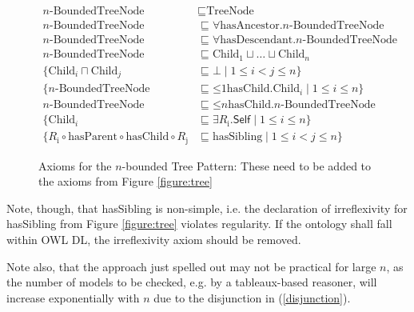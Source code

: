 \begin{figure}[t]
\begin{align}
n\text{-BoundedTreeNode} &\sqsubseteq \text{TreeNode} \\
n\text{-BoundedTreeNode} &\sqsubseteq \forall \text{hasAncestor}.n\text{-BoundedTreeNode} \\
n\text{-BoundedTreeNode} &\sqsubseteq \forall \text{hasDescendant}.n\text{-BoundedTreeNode} \\
n\text{-BoundedTreeNode} &\sqsubseteq \text{Child}_1 \sqcup \ldots \sqcup \text{Child}_n \label{disjunction} \\
\{\text{Child}_i \sqcap \text{Child}_j &\sqsubseteq \bot \mid 1 \leq i < j \leq n \} \label{disjoint} \\
\{n\text{-BoundedTreeNode} &\sqsubseteq \mathord{\leq} 1 \text{hasChild}.\text{Child}_i \mid 1 \leq i \leq n\} \label{atMost1Childi}\\
n\text{-BoundedTreeNode} &\sqsubseteq \mathord{\leq} n \text{hasChild}.n\text{-BoundedTreeNode} \\
\{\text{Child}_i &\sqsubseteq \exists R_\text{i}.\textsf{Self} \mid 1 \leq i \leq n\} \label{selfConnect} \\
\{R_\text{i} \circ \text{hasParent} \circ \text{hasChild} \circ R_\text{j} &\sqsubseteq \text{hasSibling} \mid 1 \leq i < j \leq n \} \label{chain} 
\end{align}
\caption{Axioms for the $n$-bounded Tree Pattern: These need to be added to the axioms from Figure \ref{figure:tree}}
\label{figure:binaryTreeAxioms}
\end{figure}

Note, though, that hasSibling is non-simple, i.e. the declaration of irreflexivity for hasSibling from Figure \ref{figure:tree} violates regularity. If the ontology shall fall within OWL DL, the irreflexivity axiom should be removed.

Note also, that the approach just spelled out may not be practical for large $n$, as the number of models to be checked, e.g. by a tableaux-based reasoner, will increase exponentially with $n$ due to the disjunction in (\ref{disjunction}).


